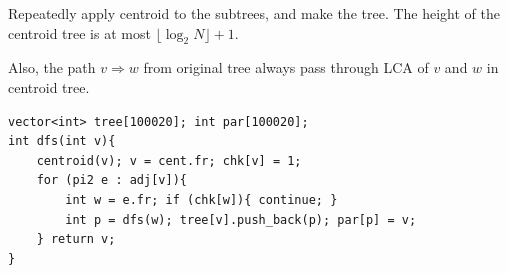 Repeatedly apply centroid to the subtrees, and make the tree. The height of the centroid tree is at most $\lfloor \log_2 N \rfloor + 1$.

Also, the path $v \Rightarrow w$ from original tree always pass through LCA of $v$ and $w$ in centroid tree.
\begin{verbatim}
vector<int> tree[100020]; int par[100020];
int dfs(int v){
	centroid(v); v = cent.fr; chk[v] = 1;
	for (pi2 e : adj[v]){
		int w = e.fr; if (chk[w]){ continue; }
		int p = dfs(w); tree[v].push_back(p); par[p] = v;
	} return v;
}
\end{verbatim}